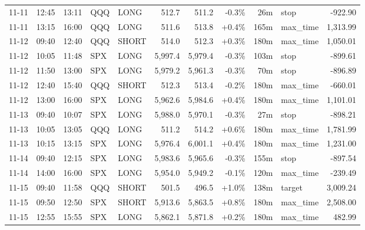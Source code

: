 \documentclass[11pt,a4paper,twoside]{article}
\begin{document}
\begin{center}
\begin{longtable}{>{\color{txtmain}}l l l l l r r r r >{\color{txtmain}}l r}
11-11 & 12:45 & 13:11 & QQQ & LONG & 512.7 & 511.2 & \textcolor{lossred}{-0.3\%} & 26m & stop & \textcolor{lossred}{-922.90} \\
11-11 & 13:15 & 16:00 & QQQ & LONG & 511.6 & 513.8 & \textcolor{wingreen}{+0.4\%} & 165m & max\_time & \textcolor{wingreen}{1,313.99} \\
11-12 & 09:40 & 12:40 & QQQ & SHORT & 514.0 & 512.3 & \textcolor{wingreen}{+0.3\%} & 180m & max\_time & \textcolor{wingreen}{1,050.01} \\
11-12 & 10:05 & 11:48 & SPX & LONG & 5,997.4 & 5,979.4 & \textcolor{lossred}{-0.3\%} & 103m & stop & \textcolor{lossred}{-899.61} \\
11-12 & 11:50 & 13:00 & SPX & LONG & 5,979.2 & 5,961.3 & \textcolor{lossred}{-0.3\%} & 70m & stop & \textcolor{lossred}{-896.89} \\
11-12 & 12:40 & 15:40 & QQQ & SHORT & 512.3 & 513.4 & \textcolor{lossred}{-0.2\%} & 180m & max\_time & \textcolor{lossred}{-660.01} \\
11-12 & 13:00 & 16:00 & SPX & LONG & 5,962.6 & 5,984.6 & \textcolor{wingreen}{+0.4\%} & 180m & max\_time & \textcolor{wingreen}{1,101.01} \\
11-13 & 09:40 & 10:07 & SPX & LONG & 5,988.0 & 5,970.1 & \textcolor{lossred}{-0.3\%} & 27m & stop & \textcolor{lossred}{-898.21} \\
11-13 & 10:05 & 13:05 & QQQ & LONG & 511.2 & 514.2 & \textcolor{wingreen}{+0.6\%} & 180m & max\_time & \textcolor{wingreen}{1,781.99} \\
11-13 & 10:15 & 13:15 & SPX & LONG & 5,976.4 & 6,001.1 & \textcolor{wingreen}{+0.4\%} & 180m & max\_time & \textcolor{wingreen}{1,231.00} \\
11-14 & 09:40 & 12:15 & SPX & LONG & 5,983.6 & 5,965.6 & \textcolor{lossred}{-0.3\%} & 155m & stop & \textcolor{lossred}{-897.54} \\
11-14 & 14:00 & 16:00 & SPX & LONG & 5,954.0 & 5,949.2 & \textcolor{lossred}{-0.1\%} & 120m & max\_time & \textcolor{lossred}{-239.49} \\
11-15 & 09:40 & 11:58 & QQQ & SHORT & 501.5 & 496.5 & \textcolor{wingreen}{+1.0\%} & 138m & target & \textcolor{wingreen}{3,009.24} \\
11-15 & 09:50 & 12:50 & SPX & SHORT & 5,913.6 & 5,863.5 & \textcolor{wingreen}{+0.8\%} & 180m & max\_time & \textcolor{wingreen}{2,508.00} \\
11-15 & 12:55 & 15:55 & SPX & LONG & 5,862.1 & 5,871.8 & \textcolor{wingreen}{+0.2\%} & 180m & max\_time & \textcolor{wingreen}{482.99} \\

\end{longtable}
\end{center}
\end{document}
